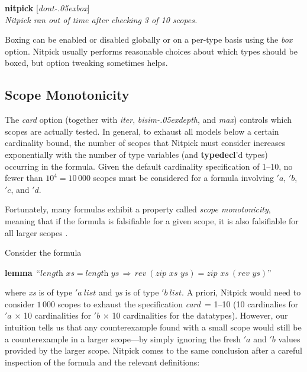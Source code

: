 \documentclass[a4paper,12pt]{article}
\renewcommand\_{\hbox{\textunderscore\kern-.05ex}}
\begin{document}
\prew
\textbf{nitpick} [\textit{dont\_box}] \\[2\smallskipamount]
{\slshape Nitpick ran out of time after checking 3 of 10 scopes.}
\postw

Boxing can be enabled or disabled globally or on a per-type basis using the
\textit{box} option. Nitpick usually performs reasonable choices about which
types should be boxed, but option tweaking sometimes helps.


\subsection{Scope Monotonicity}
\label{scope-monotonicity}

The \textit{card} option (together with \textit{iter}, \textit{bisim\_depth},
and \textit{max}) controls which scopes are actually tested. In general, to
exhaust all models below a certain cardinality bound, the number of scopes that
Nitpick must consider increases exponentially with the number of type variables
(and \textbf{typedecl}'d types) occurring in the formula. Given the default
cardinality specification of 1--10, no fewer than $10^4 = 10\,000$ scopes must be
considered for a formula involving $'a$, $'b$, $'c$, and $'d$.

Fortunately, many formulas exhibit a property called \textsl{scope
monotonicity}, meaning that if the formula is falsifiable for a given scope,
it is also falsifiable for all larger scopes \cite[p.~165]{jackson-2006}.

Consider the formula

\prew
\textbf{lemma}~``$\textit{length~xs} = \textit{length~ys} \,\Longrightarrow\, \textit{rev}~(\textit{zip~xs~ys}) = \textit{zip~xs}~(\textit{rev~ys})$''
\postw

where \textit{xs} is of type $'a~\textit{list}$ and \textit{ys} is of type
$'b~\textit{list}$. A priori, Nitpick would need to consider $1\,000$ scopes to
exhaust the specification \textit{card}~= 1--10 (10 cardinalies for $'a$
$\times$ 10 cardinalities for $'b$ $\times$ 10 cardinalities for the datatypes).
However, our intuition tells us that any counterexample found with a small scope
would still be a counterexample in a larger scope---by simply ignoring the fresh
$'a$ and $'b$ values provided by the larger scope. Nitpick comes to the same
conclusion after a careful inspection of the formula and the relevant
definitions:
\end{document}
